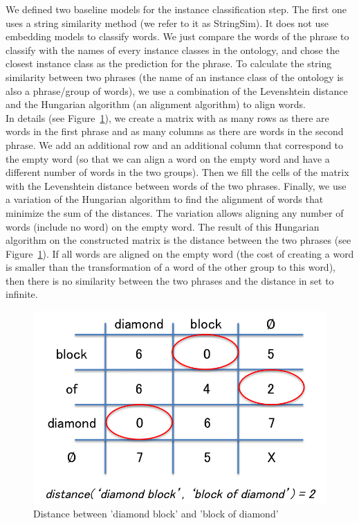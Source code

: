 \documentclass[12pt]{article}
\begin{document}
We defined two baseline models for the instance classification step.
The first one uses a string similarity method (we refer to it as StringSim). It does not use embedding models to classify words. We just compare the words of the phrase to classify with the names of every instance classes in the ontology, and chose the closest instance class as the prediction for the phrase. To calculate the string similarity between two phrases (the name of an instance class of the ontology is also a phrase/group of words), we use a combination of the Levenshtein distance and the Hungarian algorithm (an alignment algorithm) to align words.\\
In details (see Figure~\ref{distance}), we create a matrix with as many rows as there are words in the first phrase and as many columns as there are words in the second phrase. We add an additional row and an additional column that correspond to the empty word (so that we can align a word on the empty word and have a different number of words in the two groups). Then we fill the cells of the matrix with the Levenshtein distance between words of the two phrases. Finally, we use a variation of the Hungarian algorithm to find the alignment of words that minimize the sum of the distances. The variation allows aligning any number of words (include no word) on the empty word. The result of this Hungarian algorithm on the constructed matrix is the distance between the two phrases (see Figure~\ref{distance}). If all words are aligned on the empty word (the cost of creating a word is smaller than the transformation of a word of the other group to this word), then there is no similarity between the two phrases and the distance in set to infinite.

\begin{figure}[!ht]
   \centering \includegraphics[width=0.65\linewidth]{Figures/Semantic_Parsing/distance.png}
   \caption{\label{distance} Distance between 'diamond block' and 'block of diamond'}
\end{figure}
\end{document}
